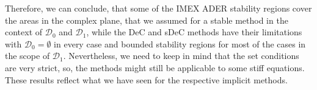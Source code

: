 Therefore, we can conclude, that some of the IMEX ADER stability regions cover the areas in the complex plane, that we assumed for a stable method in the context of $\mathcal{D}_0$ and $\mathcal{D}_1$, while the DeC and sDeC methods have their limitations with $\mathcal{D}_0= \emptyset$ in every case and bounded stability regions for most of the cases in the scope of $\mathcal{D}_1$. Nevertheless, we need to keep in mind that the set conditions are very strict, so,  the methods might still be applicable to some stiff equations. %
These results reflect what we have seen for the respective implicit methods.
